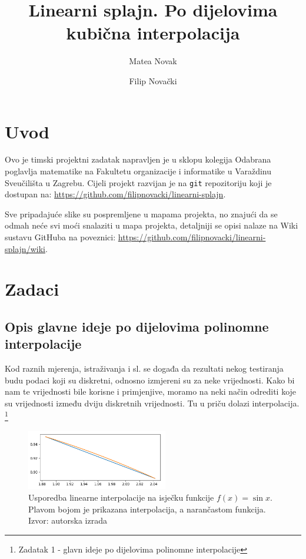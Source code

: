 \documentclass[12pt,a4paper]{report}
\author{Matea Novak \and Filip Novački}
\title{Linearni splajn. Po dijelovima kubična interpolacija}
\begin{document}
	\maketitle
	
	\tableofcontents
	
\chapter{Uvod}
	Ovo je timski projektni zadatak napravljen je u sklopu kolegija Odabrana poglavlja matematike na Fakultetu organizacije i informatike u Varaždinu Sveučilišta u Zagrebu. Cijeli projekt razvijan je na \texttt{git} repozitoriju koji je dostupan na: \url{https://github.com/filipnovacki/linearni-splajn}. 
	
	Sve pripadajuće slike su pospremljene u mapama projekta, no znajući da se odmah neće svi moći snalaziti u mapa projekta, detaljniji se opisi nalaze na Wiki sustavu GitHuba na poveznici: \url{https://github.com/filipnovacki/linearni-splajn/wiki}.
\chapter{Zadaci}
	\section{Opis glavne ideje po dijelovima polinomne interpolacije}
	Kod raznih mjerenja, istraživanja i sl. se događa da rezultati nekog testiranja budu podaci koji su diskretni, odnosno izmjereni su za neke vrijednosti. Kako bi nam te vrijednosti bile korisne i primjenjive, moramo na neki način odrediti koje su vrijednosti između dviju diskretnih vrijednosti. Tu u priču dolazi interpolacija. \footnote{Zadatak 1 - glavn ideje po dijelovima polinomne interpolacije}
	
	\begin{figure}
		\includegraphics[width=0.55\textwidth]{slike/usporedba.png}
		\caption{Usporedba linearne interpolacije na isječku funkcije $f(x)=\sin x$. Plavom bojom je prikazana interpolacija, a narančastom funkcija. Izvor: autorska izrada}
		\label{usporedba}
	\end{figure}
	
\end{document}
